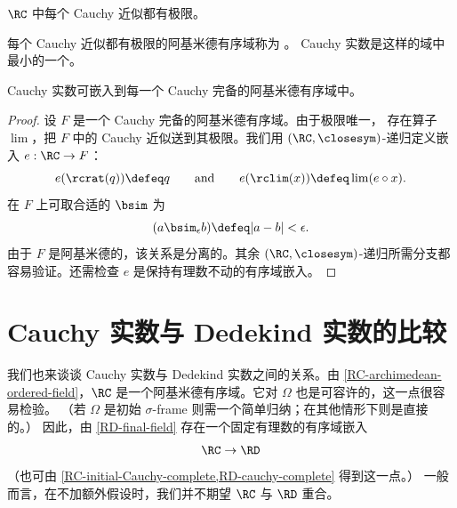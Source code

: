 \begin{thm}
  $\RC$ 中每个 Cauchy 近似都有极限。
\end{thm}

每个 Cauchy 近似都有极限的阿基米德有序域称为
。
%
%
%
Cauchy 实数是这样的域中最小的一个。

\begin{thm} \label{RC-initial-Cauchy-complete}
  Cauchy 实数可嵌入到每一个 Cauchy 完备的阿基米德有序域中。
\end{thm}

\begin{proof}
  设 $F$ 是一个 Cauchy 完备的阿基米德有序域。由于极限唯一，
  存在算子 $\lim$，把 $F$ 中的 Cauchy 近似送到其极限。我们用 $(\RC, {\closesym})$-递归定义嵌入 $e : \RC \to F$：
  \begin{equation*}
    e(\rcrat(q)) \defeq q
    \qquad\text{and}\qquad
    e(\rclim(x)) \defeq \lim (e \circ x).
  \end{equation*}
  在 $F$ 上可取合适的 $\bsim$ 为
  \begin{equation*}
    (a \bsim_\epsilon b) \defeq |a - b| < \epsilon.
  \end{equation*}
  由于 $F$ 是阿基米德的，该关系是分离的。其余
  $(\RC, {\closesym})$-递归所需分支都容易验证。还需检查 $e$
  是保持有理数不动的有序域嵌入。
\end{proof}

%
\section{Cauchy 实数与 Dedekind 实数的比较}
\label{sec:comp-cauchy-dedek}

%
%

我们也来谈谈 Cauchy 实数与 Dedekind 实数之间的关系。由
\cref{RC-archimedean-ordered-field}，$\RC$ 是一个阿基米德有序域。它对 $\Omega$ 也是可容许的，这一点很容易检验。
（若 $\Omega$ 是初始
$\sigma$-frame
%
%
则需一个简单归纳；在其他情形下则是直接的。）
因此，由 \cref{RD-final-field} 存在一个固定有理数的有序域嵌入
%
\begin{equation*}
  \RC \to \RD
\end{equation*}
%
（也可由 \cref{RC-initial-Cauchy-complete,RD-cauchy-complete} 得到这一点。）
一般而言，在不加额外假设时，我们并不期望 $\RC$ 与 $\RD$ 重合。

